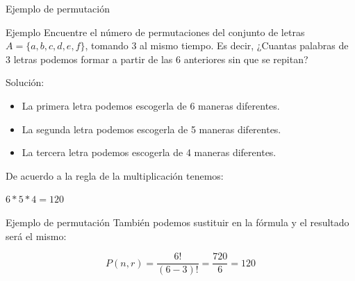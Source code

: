 \documentclass{beamer}
\begin{document}
\begin{frame}{Ejemplo de permutaci\'on} 

  \begin{exampleblock}{Ejemplo}
    Encuentre el n\'umero de permutaciones del conjunto de letras $A =
    \{a,b,c,d,e,f\}$, tomando 3 al mismo tiempo. Es decir, ¿Cuantas palabras de 3
    letras podemos formar a partir de las 6 anteriores sin que se repitan?
  \end{exampleblock}
  
  Soluci\'on:

  \begin{itemize}
    \item La primera letra podemos escogerla de 6 maneras diferentes.
    \item La segunda letra podemos escogerla de 5 maneras diferentes.
    \item La tercera letra podemos escogerla de 4 maneras diferentes.
  \end{itemize}
  De acuerdo a la regla de la multiplicaci\'on tenemos:
  \begin{exampleblock}{}
    \centering
    $6*5*4 = 120$
  \end{exampleblock}

\end{frame}

\begin{frame}{Ejemplo de permutaci\'on}
  Tambi\'en podemos sustituir en la f\'ormula y el resultado ser\'a el mismo:
  \begin{exampleblock}{}
    \begin{equation}
        P(n,r) =  \frac{6 !}{(6 - 3)!} = \frac{720}{6} = 120
    \end{equation}
  \end{exampleblock}
\end{frame}
\end{document}

